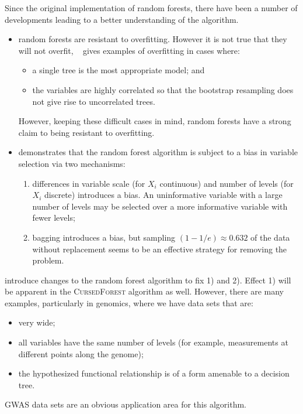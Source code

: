 \documentclass[10pt,letterpaper]{article}
\newcommand{\cursedforest}{\textsc{CursedForest}\xspace}
\begin{document}
Since the original implementation of random forests, there have been a number of developments leading to a better
understanding of the algorithm.
\begin{itemize}
\item random forests are resistant to overfitting. However it is not true that they will not overfit,
  ~\cite{Segal.2004} gives examples of overfitting in cases where:
  \begin{itemize}
  \item a single tree is the most appropriate model; and
  \item the variables are highly correlated so that the bootstrap resampling does not give rise to uncorrelated trees.
  \end{itemize}
However, keeping these difficult cases in mind, random forests have a strong claim to being resistant to overfitting.
\item \cite{Strobl.et.al.2007} demonstrates that the random forest algorithm is subject to a bias in variable selection
  via two mechanisms:
  \begin{enumerate}
  \item differences in variable scale (for $X_i$ continuous) and number of levels (for $X_i$ discrete) introduces a
    bias. An uninformative variable with a large number of levels may be selected over a more informative variable with
    fewer levels;
  \item bagging introduces a bias, but sampling $(1- 1/e) \approx 0.632$ of the data without replacement seems to be an
    effective strategy for removing the problem.
  \end{enumerate}
\end{itemize} 

\cite{Strobl.et.al.2007} introduce changes to the random forest algorithm to fix 1) and 2).  Effect 1) will be apparent
in the \cursedforest algorithm as well.  However, there are many examples, particularly in genomics, where we have data
sets that are:
\begin{itemize}
\item very wide;
\item all variables have the same number of levels (for example, measurements at different points along the genome);
\item the hypothesized functional relationship is of a form amenable to a decision tree.
\end{itemize}
GWAS data sets are an obvious application area for this algorithm. 
\end{document}
